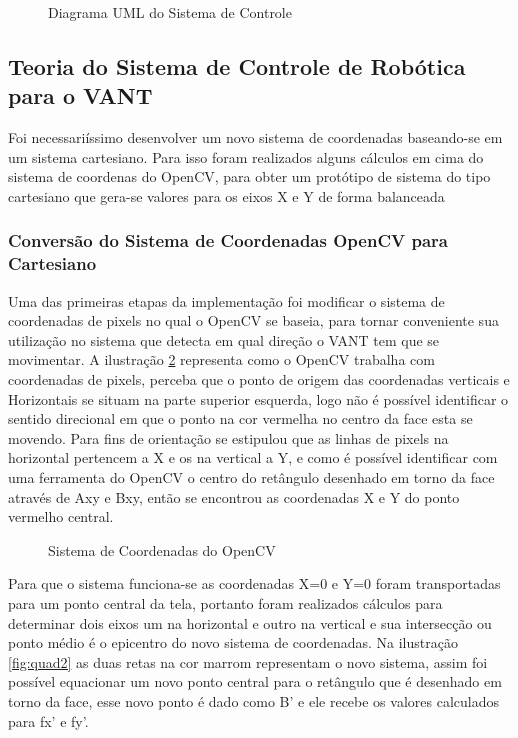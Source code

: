 \begin{figure}[H]
	\centering	
	\caption{Diagrama UML do Sistema de Controle}
	\fontsize{9pt}{12pt}\selectfont
	\def\svgwidth{8cm}
	
	\label{fig:diagcont}
\end{figure}
\subsection{Teoria do Sistema de Controle de Robótica para o VANT}

Foi necessariíssimo desenvolver um novo sistema de coordenadas baseando-se em um sistema cartesiano. Para isso foram realizados alguns cálculos em cima do sistema de coordenas do OpenCV, para obter um protótipo de sistema do tipo cartesiano que gera-se valores para os eixos X e Y de forma balanceada 

\subsubsection{Conversão do Sistema de Coordenadas OpenCV para Cartesiano}

Uma das primeiras etapas da implementação foi modificar o sistema de coordenadas de pixels no qual o OpenCV se baseia, para tornar conveniente sua utilização no sistema que detecta em qual direção o VANT tem que se movimentar. A ilustração \ref{fig:quad1} representa como o OpenCV trabalha com coordenadas de pixels, perceba que o ponto de origem das coordenadas verticais e Horizontais se situam na parte superior esquerda, logo não é possível identificar o sentido direcional em que o ponto na cor vermelha no centro da face esta se movendo. Para fins de orientação se estipulou que as linhas de pixels na horizontal pertencem a X e os na vertical a Y, e como é possível identificar com uma ferramenta do OpenCV o centro do retângulo desenhado em torno da face através de Axy e Bxy, então se encontrou as coordenadas X e Y do ponto vermelho central.

\begin{figure}[H]
	\centering
	\caption{Sistema de Coordenadas do OpenCV}
	
	\label{fig:quad1}
\end{figure}

Para que o sistema funciona-se as coordenadas X=0 e Y=0 foram transportadas para um ponto central da tela, portanto foram realizados cálculos para determinar dois eixos um na horizontal e outro na vertical e sua intersecção ou ponto médio é o epicentro do novo sistema de coordenadas. Na ilustração \ref{fig:quad2} as duas retas na cor marrom representam o novo sistema, assim foi possível equacionar um novo ponto central para o retângulo que é  desenhado em torno da face, esse novo ponto é dado como B' e ele recebe os valores calculados para fx' e fy'.   

